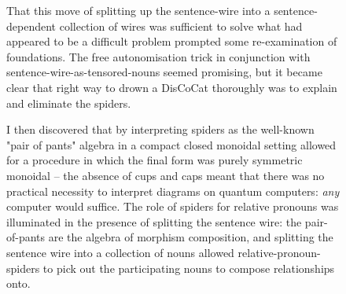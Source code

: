 \begin{figure}[h!]
\centering
{}
\caption{That this move of splitting up the sentence-wire into a sentence-dependent collection of wires was sufficient to solve what had appeared to be a difficult problem prompted some re-examination of foundations. The free autonomisation trick in conjunction with sentence-wire-as-tensored-nouns seemed promising, but it became clear that right way to drown a DisCoCat thoroughly was to explain and eliminate the spiders.}
\end{figure}

\begin{figure}[h!]
\centering
{}
\caption{I then discovered that by interpreting spiders as the well-known "pair of pants" algebra in a compact closed monoidal setting allowed for a procedure in which the final form was purely symmetric monoidal -- the absence of cups and caps meant that there was no practical necessity to interpret diagrams on quantum computers: \emph{any} computer would suffice. The role of spiders for relative pronouns was illuminated in the presence of splitting the sentence wire: the pair-of-pants are the algebra of morphism composition, and splitting the sentence wire into a collection of nouns allowed relative-pronoun-spiders to pick out the participating nouns to compose relationships onto.}
\end{figure}

